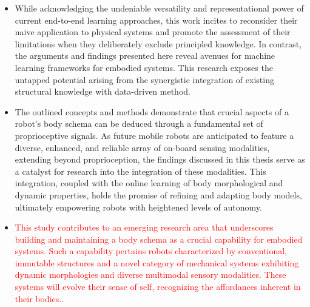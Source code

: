 \documentclass[12pt, a4paper]{article}
\newcommand{\redtext}[1]{\textcolor{red}{#1}}
\begin{document}
\begin{itemize}
	
	\item While acknowledging the undeniable versatility and representational power of current end-to-end learning approaches, this work incites to reconsider their naive application to physical systems and promote the assessment of their limitations when they deliberately exclude principled knowledge. In contrast, the arguments and findings presented here reveal avenues for machine learning frameworks for embodied systems. This research exposes the untapped potential arising from the synergistic integration of existing structural knowledge with data-driven method.
		
	\item The outlined concepts and methods demonstrate that crucial aspects of a robot's body schema can be deduced through a fundamental set of proprioceptive signals. As future mobile robots are anticipated to feature a diverse, enhanced, and reliable array of on-board sensing modalities, extending beyond proprioception, the findings discussed in this thesis serve as a catalyst for research into the integration of these modalities. This integration, coupled with the online learning of body morphological and dynamic properties, holds the promise of refining and adapting body models, ultimately empowering robots with heightened levels of autonomy.

	\item \redtext{This study contributes to an emerging research area that underscores building and maintaining a body schema as a crucial capability for embodied systems. Such a capability pertains robots characterized by conventional, immutable structures and a novel category of mechanical systems exhibiting dynamic morphologies and diverse multimodal sensory modalities. These systems will evolve their sense of self, recognizing the affordances inherent in their bodies.}.
		
		
	

\end{itemize}
\end{document}
